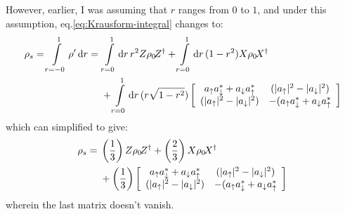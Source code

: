 \documentclass[english]{article}
\DeclarePairedDelimiter\abs{\lvert}{\rvert}
\begin{document}
However, earlier, I was assuming that $r$ ranges from $0$ to $1$, and under this assumption, eq.\eqref{eq:Krausform-integral} changes to:
\begin{equation}\label{eq:Krausform-integral-actual}
  \begin{aligned}
    \rho_{s} = \int\limits_{r=-0}^{1}\rho^{\prime}\,\mathrm{d}r = {} & \int\limits_{r=0}^{1}\mathrm{d}r\,r^{2}Z\rho_{0}\!Z^{\dagger} + \int\limits_{r=0}^{1}\mathrm{d}r\,(1-r^{2})X\rho_{0}\!X^{\dagger} \\
                  & + \int\limits_{r=0}^{1}\mathrm{d}r\,(r\sqrt{1-r^{2}})\left[\begin{array}{cc}a_{\uparrow}a_{\downarrow}^{*}+a_{\downarrow}a_{\uparrow}^{*} & (\abs{a_{\uparrow}}^{2}-\abs{a_{\downarrow}}^{2}) \\
             (\abs{a_{\uparrow}}^{2}-\abs{a_{\downarrow}}^{2}) & -(a_{\uparrow}a_{\downarrow}^{*}+a_{\downarrow}a_{\uparrow}^{*} \end{array}\right]
  \end{aligned}
\end{equation}
which can simplified to give:
\begin{equation}\label{eq:actual-decomp}
  \begin{aligned}
    \rho_{s} = {} & \left(\dfrac{1}{3}\right)Z\rho_{0}\!Z^{\dagger} + \left(\dfrac{2}{3}\right)X\rho_{0}\!X^{\dagger} \\
                  & + \left(\dfrac{1}{3}\right)\left[\begin{array}{cc}a_{\uparrow}a_{\downarrow}^{*}+a_{\downarrow}a_{\uparrow}^{*} & (\abs{a_{\uparrow}}^{2}-\abs{a_{\downarrow}}^{2}) \\
             (\abs{a_{\uparrow}}^{2}-\abs{a_{\downarrow}}^{2}) & -(a_{\uparrow}a_{\downarrow}^{*}+a_{\downarrow}a_{\uparrow}^{*} \end{array}\right]
  \end{aligned}
\end{equation}
wherein the last matrix doesn't vanish.

\end{document}

